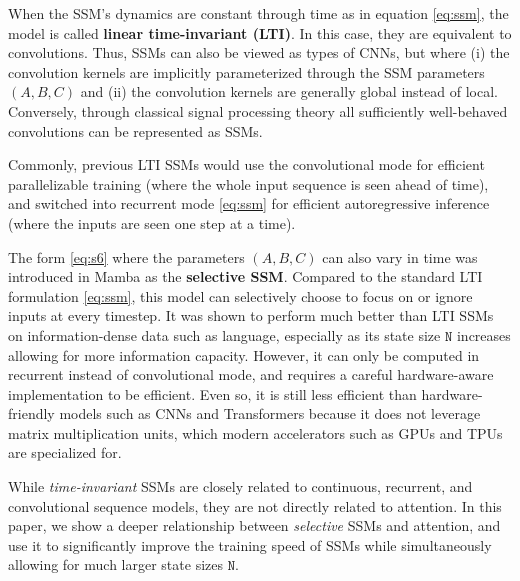 {
When the SSM's dynamics are constant through time as in equation \eqref{eq:ssm}, the model is called \textbf{linear time-invariant (LTI)}.
In this case, they are equivalent to convolutions.
Thus, SSMs can also be viewed as types of CNNs, but where (i) the convolution kernels are implicitly parameterized through the SSM parameters $(A, B, C)$ and
(ii) the convolution kernels are generally global instead of local.
Conversely, through classical signal processing theory all sufficiently well-behaved convolutions can be represented as SSMs.

Commonly, previous LTI SSMs would use the convolutional mode for efficient parallelizable training (where the whole input sequence is seen ahead of time), %
and switched into recurrent mode \eqref{eq:ssm} for efficient autoregressive inference (where the inputs are seen one step at a time).

}{}

The form \eqref{eq:s6} where the parameters $(A, B, C)$ can also vary in time was introduced in Mamba as the \textbf{selective SSM}.
Compared to the standard LTI formulation \eqref{eq:ssm}, this model can selectively choose to focus on or ignore inputs at every timestep.
It was shown to perform much better than LTI SSMs on information-dense data such as language,
especially as its state size $\mathtt{N}$ increases allowing for more information capacity.
However, it can only be computed in recurrent instead of convolutional mode, and requires a careful hardware-aware implementation to be efficient.
Even so, it is still less efficient than hardware-friendly models such as CNNs and Transformers because it does not leverage matrix multiplication units, which modern accelerators such as GPUs and TPUs are specialized for.

While \emph{time-invariant} SSMs are closely related to continuous, recurrent, and convolutional sequence models,
they are not directly related to attention.
In this paper, we show a deeper relationship between \emph{selective} SSMs and attention,
and use it to significantly improve the training speed of SSMs while simultaneously allowing for much larger state sizes $\mathtt{N}$.

%






%

